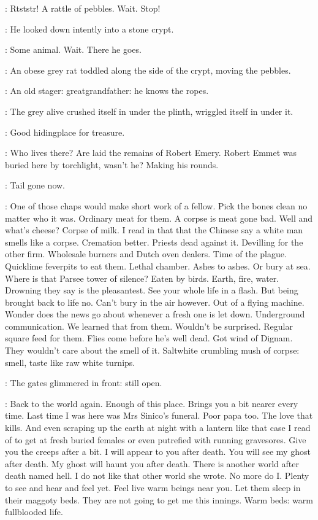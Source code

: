\BloomInt:
Rtststr!
A rattle of pebbles.
Wait.
Stop!

:
He looked down intently into a stone crypt.

\BloomInt:
Some animal.
Wait.
There he goes.

:
An obese grey rat toddled along the side of the crypt, moving the pebbles.

\BloomInt:
An old stager:
greatgrandfather:
he knows the ropes.

:
The grey alive crushed itself in under the plinth,
wriggled itself in under it.

\BloomInt:
Good hidingplace for treasure.

\BloomInt:
Who lives there?
Are laid the remains of Robert Emery.
Robert Emmet was buried here by torchlight, wasn't he?
Making his rounds.

\BloomInt:
Tail gone now.

\BloomInt:
One of those chaps would make short work of a fellow.
Pick the bones clean no matter who it was.
Ordinary meat for them.
A corpse is meat gone bad.
Well and what's cheese?
Corpse of milk.
I read in that 
that the Chinese say a white man smells like a corpse.
Cremation better.
Priests dead against it.
Devilling for the other firm.
Wholesale burners and Dutch oven dealers.
Time of the plague.
Quicklime feverpits to eat them.
Lethal chamber.
Ashes to ashes.
Or bury at sea.
Where is that Parsee tower of silence?
Eaten by birds.
Earth, fire, water.
Drowning they say is the pleasantest.
See your whole life in a flash.
But being brought back to life no.
Can't bury in the air however.
Out of a flying machine.
Wonder does the news go about whenever a fresh one is let down.
Underground communication.
We learned that from them.
Wouldn't be surprised.
Regular square feed for them.
Flies come before he's well dead.
Got wind of Dignam.
They wouldn't care about the smell of it.
Saltwhite crumbling mush of corpse:
smell, taste like raw white turnips.

:
The gates glimmered in front:
still open.

\BloomInt:
Back to the world again.
Enough of this place.
Brings you a bit nearer every time.
Last time I was here was Mrs Sinico's funeral.
Poor papa too.
The love that kills.
And even scraping up the earth at night with a lantern
like that case I read of
to get at fresh buried females
or even putrefied with running gravesores.
Give you the creeps after a bit.
I will appear to you after death.
You will see my ghost after death.
My ghost will haunt you after death.
There is another world after death named hell.
I do not like that other world she wrote.
No more do I.
Plenty to see and hear and feel yet.
Feel live warm beings near you.
Let them sleep in their maggoty beds.
They are not going to get me this innings.
Warm beds:
warm fullblooded life.

